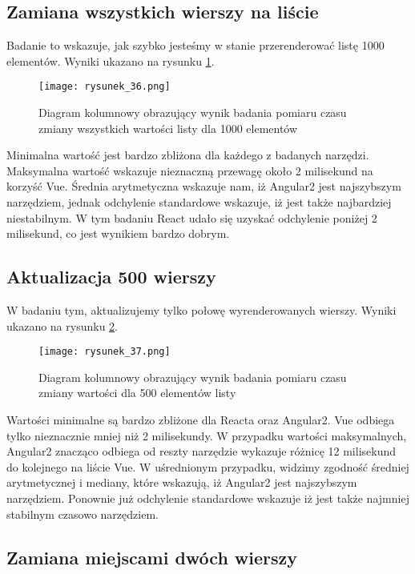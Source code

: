 \clearpage
\subsection{Zamiana wszystkich wierszy na liście}

Badanie to wskazuje, jak szybko jesteśmy w stanie przerenderować listę 1000 elementów. Wyniki ukazano na rysunku \ref{fig:rysunek_36}.

\begin{figure}[htbp]
    \centering
    \texttt{[image: rysunek\_36.png]}
    \caption{Diagram kolumnowy obrazujący wynik badania pomiaru czasu zmiany wszystkich wartości listy dla 1000 elementów}
    \label{fig:rysunek_36}
\end{figure}

Minimalna wartość jest bardzo zbliżona dla każdego z badanych narzędzi. Maksymalna wartość wskazuje nieznaczną przewagę około 2 milisekund na korzyść Vue.
Średnia arytmetyczna wskazuje nam, iż Angular2 jest najszybszym narzędziem, jednak odchylenie standardowe wskazuje, iż jest także najbardziej niestabilnym.
W tym badaniu React udało się uzyskać odchylenie poniżej 2 milisekund, co jest wynikiem bardzo dobrym.

\clearpage
\subsection{Aktualizacja 500 wierszy}
W badaniu tym, aktualizujemy tylko połowę wyrenderowanych wierszy. Wyniki ukazano na rysunku \ref{fig:rysunek_37}.
\begin{figure}[htbp]
    \centering
    \texttt{[image: rysunek\_37.png]}
    \caption{Diagram kolumnowy obrazujący wynik badania pomiaru czasu zmiany wartości dla 500 elementów listy}
    \label{fig:rysunek_37}
\end{figure}
Wartości minimalne są bardzo zbliżone dla Reacta oraz Angular2. Vue odbiega tylko nieznacznie mniej niż 2 milisekundy.
W przypadku wartości maksymalnych, Angular2 znacząco odbiega od reszty narzędzie wykazuje różnicę 12 milisekund do kolejnego na liście Vue.
W uśrednionym przypadku, widzimy zgodność średniej arytmetycznej i mediany, które wskazują, iż Angular2 jest najszybszym narzędziem.
Ponownie już odchylenie standardowe wskazuje iż jest także najmniej stabilnym czasowo narzędziem.

\clearpage
\subsection{Zamiana miejscami dwóch wierszy}

